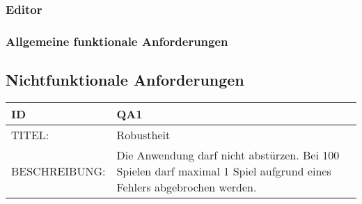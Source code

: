 \documentclass{uulm-assignment}
\begin{document}
\subsubsection{Editor}

\subsubsection{Allgemeine funktionale Anforderungen}


\subsection{Nichtfunktionale Anforderungen}


\begin{tabularx}{16cm}{l|X}
\textbf{ID} & \textbf{QA1} \\
\hline
TITEL: & Robustheit \\
\hline
BESCHREIBUNG: & Die Anwendung darf nicht abstürzen. Bei 100 Spielen darf maximal 1 Spiel
aufgrund eines Fehlers abgebrochen werden. \\
\end{tabularx}
\end{document}
